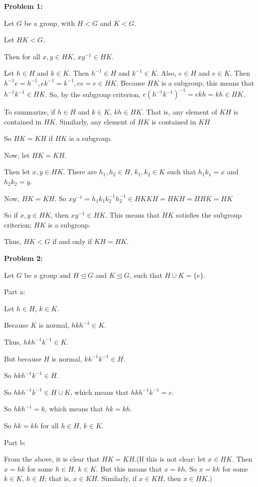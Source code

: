 \documentclass[a4paper,12pt]{article}
\newcommand{\tab}{\hspace{4mm}} %
\newcommand{\shunt}{\vspace{20mm}}
\newcommand{\subgp}{\mathrel{\unlhd}}
\begin{document}
{\bf Problem 1:}

Let $G$ be a group, with $H<G$ and $K <G$.

Let $HK < G$.

\tab Then for all $x,y \in HK$, $xy^{-1} \in HK$.

\tab Let $h \in H$ and $k \in K$. Then $h^{-1} \in H$ and $k^{-1} \in K$. Also, $e \in H$ and $e \in K$. Then $h^{-1}e=h^{-1},ek^{-1}=k^{-1},ee=e \in HK$. Because $HK$ is a subgroup, this means that $h^{-1}k^{-1} \in HK$. So, by the subgroup criterion, $e(h^{-1}k^{-1})^{-1}=ekh = kh \in HK$.

\tab To summarize, if $h \in H$ and $k \in K$, $kh \in HK$. That is, any element of $KH$ is contained in $HK$. Similarly, any element of $HK$ is contained in $KH$

\tab So $HK = KH$ if $HK$ is a subgroup.

Now, let $HK=KH$.

\tab Then let $x,y \in HK$. There are $h_1,h_2 \in H$, $k_1,k_2 \in K$ such that $h_1k_1 = x$ and $h_2k_2 = y$.

\tab Now, $HK=KH$. So $xy^{-1} = h_1k_1k_2^{-1}h_2^{-1} \in HKKH=HKH=HHK=HK$

\tab So if $x,y \in HK$, then $xy^{-1} \in HK$. This means that $HK$ satisfies the subgroup criterion; $HK$ is a subgroup.

Thus, $HK < G$ if and only if $KH=HK$.

\shunt

{\bf Problem 2:}

Let $G$ be a group and $H \subgp G$ and $K \subgp G$, such that $H \cup K = \{e\}$.

Part a:

Let $h \in H$, $k \in K$.

Because $K$ is normal, $hkh^{-1} \in K$.

Thus, $hkh^{-1}k^{-1} \in K$.

But because $H$ is normal, $kh^{-1}k^{-1} \in H$.

So $hkh^{-1}k^{-1} \in H$.

So $hkh^{-1}k^{-1} \in H \cup K$, which means that $hkh^{-1}k^{-1} = e$.

So $hkh^{-1} = k$, which means that $hk = kh$.

So $hk = kh$ for all $h \in H$, $k \in K$.

\shunt

Part b:

From the above, it is clear that $HK = KH$.(If this is not clear: let $x \in HK$. Then $x = hk$ for some $h \in H$, $k \in K$. But this means that $x = kh$. So $x =kh$ for some $k \in K$, $h \in H$; that is, $x \in KH$. Similarly, if $x \in KH$, then $x \in HK$.)
\end{document}
